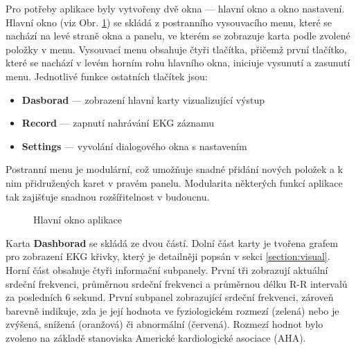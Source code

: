 Pro potřeby aplikace byly vytvořeny dvě okna --- hlavní okno a okno nastavení.
Hlavní okno (viz Obr. \ref{fig:app_main_window}) se skládá z postranního
vysouvacího menu, které se nachází na levé straně okna a panelu, ve kterém se
zobrazuje karta podle zvolené položky v menu. Vysouvací menu obsahuje čtyři
tlačítka, přičemž první tlačítko, které se nachází v levém horním rohu hlavního
okna, iniciuje vysunutí a zasunutí menu. Jednotlivé funkce ostatních tlačítek
jsou:
\begin{itemize}[noitemsep]
    \item \textbf{Dasborad} --- zobrazení hlavní karty vizualizující výstup
    \item \textbf{Record} --- zapnutí nahrávání EKG záznamu
    \item \textbf{Settings} --- vyvolání dialogového okna s nastavením
\end{itemize}
Postranní menu je modulární, což umožňuje snadné přidání nových položek a k nim
přidružených karet v pravém panelu. Modularita některých funkcí aplikace tak
zajišťuje snadnou rozšířitelnost v budoucnu.

\begin{figure}[h]
    \begin{center}
        \textcolor{cyan}{\fboxrule=0.5pt\fboxsep=0pt}
        \caption{Hlavní okno aplikace}
        \label{fig:app_main_window}
    \end{center}
\end{figure}

Karta \textbf{Dashborad} se skládá ze dvou částí. Dolní část karty je tvořena
grafem pro zobrazení EKG křivky, který je detailněji popsán v sekci
\ref{section:visual}. Horní část obsahuje čtyři informační subpanely. První tři
zobrazují aktuální srdeční frekvenci, průměrnou srdeční frekvenci a průměrnou
délku R-R intervalů za posledních 6 sekund. První subpanel zobrazující srdeční
frekvenci, zároveň barevně indikuje, zda je její hodnota ve fyziologickém
rozmezí (zelená) nebo je zvýšená, snížená (oranžová) či abnormální (červená).
Rozmezí hodnot bylo zvoleno na základě stanoviska Americké kardiologické
asociace (AHA).

